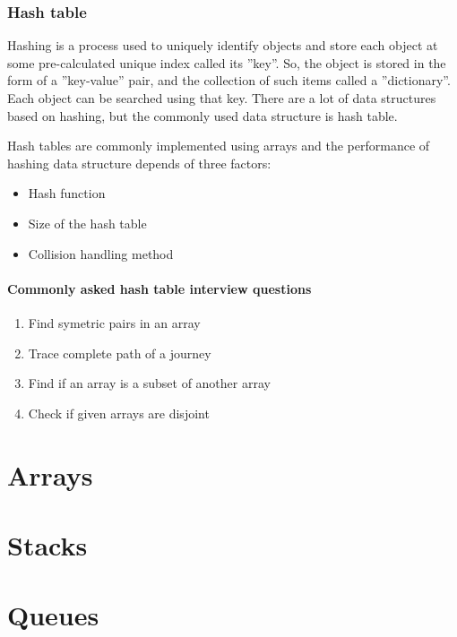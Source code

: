 \subsubsection{Hash table}
Hashing is a process used to uniquely identify objects and store each object at some pre-calculated unique index called its ''key''. So, the object is stored in the form of a ''key-value'' pair, and the collection of such items called a ''dictionary''. Each object can be searched using that key. There are a lot of data structures based on hashing, but the commonly used data structure is hash table.

Hash tables are commonly implemented using arrays and the performance of hashing data structure depends of three factors:
\begin{itemize}
    \item { Hash function }
    \item { Size of the hash table }
    \item { Collision handling method }
\end{itemize}

\paragraph{Commonly asked hash table interview questions}
\begin{enumerate}
    \item { Find symetric pairs in an array }
    \item { Trace complete path of a journey }
    \item { Find if an array is a subset of another array }
    \item { Check if given arrays are disjoint }
\end{enumerate}

\section{Arrays}


\section{Stacks}


\section{Queues}


